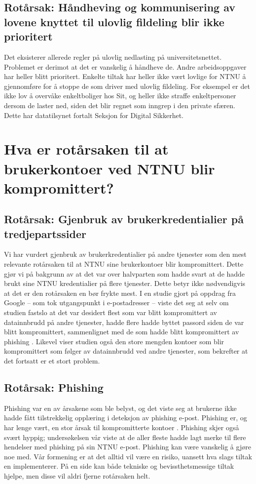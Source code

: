 \subsection{Rotårsak: Håndheving og kommunisering av lovene knyttet til ulovlig fildeling blir ikke prioritert}
Det eksisterer allerede regler på ulovlig nedlasting på universitetsnettet. Problemet er derimot at det er vanskelig å håndheve de. Andre arbeidsoppgaver har heller blitt prioritert. Enkelte tiltak har heller ikke vært lovlige for NTNU å gjennomføre for å stoppe de som driver med ulovlig fildeling. For eksempel er det ikke lov å overvåke enkeltboliger hos Sit, og heller ikke straffe enkeltpersoner dersom de laster ned, siden det blir regnet som inngrep i den private sfæren. Dette har datatilsynet fortalt Seksjon for Digital Sikkerhet. 


\section{Hva er rotårsaken til at brukerkontoer ved NTNU blir kompromittert?}

\subsection*{Rotårsak: Gjenbruk av brukerkredentialier på tredjepartssider}
Vi har vurdert gjenbruk av brukerkredentialier på andre tjenester som den mest relevante rotårsaken til at NTNU sine brukerkontoer blir kompromittert. Dette gjør vi på bakgrunn av at det var over halvparten som hadde svart at de hadde brukt sine NTNU kredentialier på flere tjenester. Dette betyr ikke nødvendigvis at det er den rotårsaken en bør frykte mest. I en studie gjort på oppdrag fra Google – som tok utgangspunkt i e-postadresser – viste det seg at selv om studien fastslo at det var desidert flest som var blitt kompromittert av datainnbrudd på andre tjenester, hadde flere hadde byttet passord siden de var blitt kompromittert, sammenlignet med de som hadde blitt kompromittert av phishing \cite{46437}. Likevel viser studien også den store mengden kontoer som blir kompromittert som følger av datainnbrudd ved andre tjenester, som bekrefter at det fortsatt er et stort problem. 

\subsection*{Rotårsak: Phishing}
Phishing var en av årsakene som ble belyst, og det viste seg at brukerne ikke hadde fått tilstrekkelig opplæring i deteksjon av phishing e-post. Phishing er, og har lenge vært, en stor årsak til kompromitterte kontoer \cite{SophPhish}. Phishing skjer også svært hyppig; undersøkelsen vår viste at de aller fleste hadde lagt merke til flere hendelser med phishing på sin NTNU e-post. Phishing kan være vanskelig å gjøre noe med. Vår formening er at det alltid vil være en risiko, uansett hva slags tiltak en implementerer. På en side kan både tekniske og bevissthetsmessige tiltak hjelpe, men disse vil aldri fjerne rotårsaken helt. 

